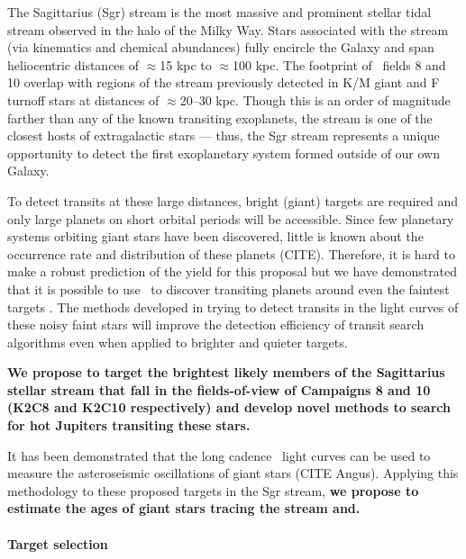 \documentclass[letterpaper,12pt,preprint]{hack_aastex}
\begin{document}
The Sagittarius (Sgr) stream is the most massive and prominent stellar tidal
stream observed in the halo of the Milky Way. Stars associated with the stream
(via kinematics and chemical abundances) fully encircle the Galaxy and span
heliocentric distances of $\approx$15 kpc to $\approx$100 kpc. The footprint
of \KT\ fields 8 and 10 overlap with regions of the stream previously detected
in K/M giant and F turnoff stars \citep{Majewski:2003, Yanny:2009} at
distances of $\approx$20--30 kpc. Though this is an order of magnitude farther
than any of the known transiting exoplanets, the stream is one of the closest
hosts of extragalactic stars --- thus, the Sgr stream represents a unique
opportunity to detect the first exoplanetary system formed outside of our own
Galaxy.

To detect transits at these large distances, bright (giant) targets are
required and only large planets on short orbital periods will be accessible.
Since few planetary systems orbiting giant stars have been discovered, little
is known about the occurrence rate and distribution of these planets (CITE).
Therefore, it is hard to make a robust prediction of the yield for this
proposal but we have demonstrated that it is possible to use \KT\ to discover
transiting planets around even the faintest targets
\citep{Foreman-Mackey:2015}.
The methods developed in trying to detect transits in the light curves of
these noisy faint stars will improve the detection efficiency of transit
search algorithms even when applied to brighter and quieter targets.

{\bf We propose to target the brightest likely members of the Sagittarius
stellar stream that fall in the fields-of-view of Campaigns 8 and 10 (K2C8 and
K2C10 respectively) and develop novel methods to search for hot Jupiters
transiting these stars.}

It has been demonstrated that the long cadence \KT\ light curves can be used
to measure the asteroseismic oscillations of giant stars (CITE Angus).
Applying this methodology to these proposed targets in the Sgr stream, {\bf we
propose to estimate the ages of giant stars tracing the stream and.}


\paragraph{Target selection}
\end{document}
